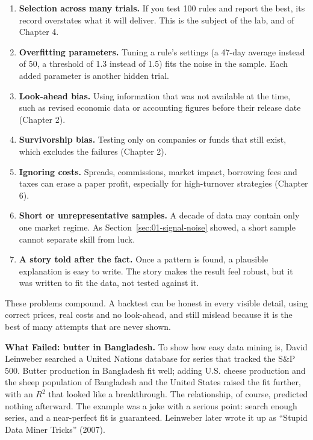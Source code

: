 \begin{enumerate}
  \item \textbf{Selection across many trials.} If you test 100 rules and report the best, its record overstates what it will deliver. This is the subject of the lab, and of Chapter 4.
  \item \textbf{Overfitting parameters.} Tuning a rule's settings (a 47-day average instead of 50, a threshold of 1.3 instead of 1.5) fits the noise in the sample. Each added parameter is another hidden trial.
  \item \textbf{Look-ahead bias.} Using information that was not available at the time, such as revised economic data or accounting figures before their release date (Chapter 2).
  \item \textbf{Survivorship bias.} Testing only on companies or funds that still exist, which excludes the failures (Chapter 2).
  \item \textbf{Ignoring costs.} Spreads, commissions, market impact, borrowing fees and taxes can erase a paper profit, especially for high-turnover strategies (Chapter 6).
  \item \textbf{Short or unrepresentative samples.} A decade of data may contain only one market regime. As Section~\ref{sec:01-signal-noise} showed, a short sample cannot separate skill from luck.
  \item \textbf{A story told after the fact.} Once a pattern is found, a plausible explanation is easy to write. The story makes the result feel robust, but it was written to fit the data, not tested against it.
\end{enumerate}

These problems compound. A backtest can be honest in every visible detail, using correct prices, real costs and no look-ahead, and still mislead because it is the best of many attempts that are never shown.

\begin{callout}
\textbf{What Failed: butter in Bangladesh.} To show how easy data mining is, David Leinweber searched a United Nations database for series that tracked the S\&P 500. Butter production in Bangladesh fit well; adding U.S. cheese production and the sheep population of Bangladesh and the United States raised the fit further, with an $R^2$ that looked like a breakthrough. The relationship, of course, predicted nothing afterward. The example was a joke with a serious point: search enough series, and a near-perfect fit is guaranteed. Leinweber later wrote it up as ``Stupid Data Miner Tricks'' (2007).
\end{callout}

